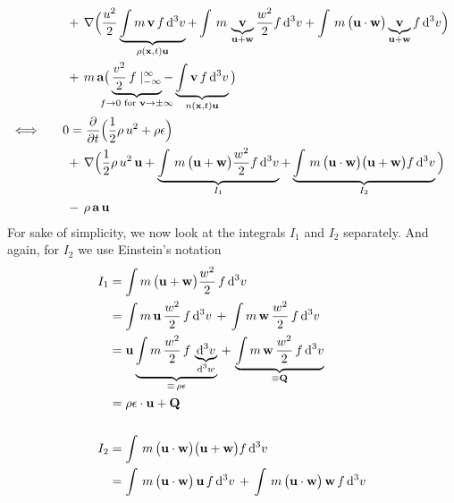 \begin{itemize}
\begin{align*}
   &\hspace{3pt} +\, \nabla\Big( \frac{u^{2}}{2}\underbrace{ \int m\,\textbf{v}\,f\,\mathrm{d}^{3}v }_{\rho(\textbf{x}, t)\textbf{u}} + \int\,m\,\underbrace{ \textbf{v} }_{\mathclap{\textbf{u}+\textbf{w}}} \frac{w^{2}}{2}f\,\mathrm{d}^{3}v + \int\,m\,\big(\textbf{u}\cdot\textbf{w}\big)\underbrace{ \textbf{v} }_{\mathclap{\textbf{u}+\textbf{w}}} f\,\mathrm{d}^{3}v \Big) \\
   &\hspace{3pt} +\, m\,\textbf{a} \big( \underbrace{ \frac{v^{2}}{2}\,f\mid_{-\infty}^{\infty} }_{\mathclap{f \rightarrow 0 \text{ for } \textbf{v} \rightarrow \pm \infty}} - \underbrace{ \int\textbf{v}\,f\,\mathrm{d}^{3}v }_{n(\textbf{x}, t)\textbf{u}} \big) \\
  \Longleftrightarrow\qquad
  &0 = \frac{\partial}{\partial t}\Big( \frac{1}{2}\rho\,u^{2} + \rho\epsilon \Big) \\
   &\hspace{3pt} +\, \nabla\Big( \frac{1}{2}\rho\,u^{2}\,\textbf{u} + \underbrace{ \int\,m\,\big(\textbf{u}+\textbf{w}\big) \frac{w^{2}}{2}f\,\mathrm{d}^{3}v }_{I_{1}} + \underbrace{ \int\,m\,\big(\textbf{u}\cdot\textbf{w}\big)\big(\textbf{u}+\textbf{w}\big) f\,\mathrm{d}^{3}v }_{I_{2}} \Big) \\
   &\hspace{3pt} -\, \rho\,\textbf{a}\,\textbf{u}
 \end{align*}
 For sake of simplicity, we now look at the integrals $I_{1}$ and $I_{2}$ separately. And again, for $I_{2}$ we use Einstein's notation
 \begin{align*}
  I_{1} &= \int m\,\big(\textbf{u}+\textbf{w}\big)\frac{w^{2}}{2}\,f\,\mathrm{d}^{3}v \\
	&= \int m\,\textbf{u}\,\frac{w^{2}}{2}\,f\,\mathrm{d}^{3}v \,+\, \int m\,\textbf{w}\,\frac{w^{2}}{2}\,f\,\mathrm{d}^{3}v \\
	&= \textbf{u}\underbrace{ \int m\,\frac{w^{2}}{2}\,f\,\underbrace{ \mathrm{d}^{3}v }_{\mathclap{\mathrm{d}^{3}w}} }_{\mathclap{\equiv\,\rho\epsilon}} \,+\, \underbrace{ \int m\,\textbf{w}\,\frac{w^{2}}{2}\,f\,\mathrm{d}^{3}v }_{\equiv \textbf{Q}} \\
	&= \rho\epsilon\cdot\textbf{u} + \textbf{Q} \\
  \\
  I_{2} &= \int\,m\,\big(\textbf{u}\cdot\textbf{w}\big)\big(\textbf{u}+\textbf{w}\big) f\,\mathrm{d}^{3}v \\
	&= \int\,m\,\big(\textbf{u}\cdot\textbf{w}\big)\,\textbf{u}\,f\,\mathrm{d}^{3}v \,+\, \int\,m\,\big(\textbf{u}\cdot\textbf{w}\big)\,\textbf{w}\,f\,\mathrm{d}^{3}v \\

\end{align*}
\end{itemize}
